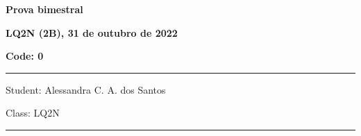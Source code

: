 \documentclass[12pt, addpoints]{exam}
\begin{document}
        \begin{minipage}[b]{0.75\linewidth}
            \begin{flushleft}
                {\bf \large Prova bimestral}
            \end{flushleft}
            \begin{flushleft}
                {\bf \large LQ2N (2B), 31 de outubro de 2022}
            \end{flushleft}
        \end{minipage}
        \begin{minipage}[b]{0.20\linewidth}
            \begin{flushright}
                {\bf \large Code: 0}
            \end{flushright}
        \end{minipage}
        \vspace{0.5cm} \hrule \vspace{0.5cm}
        \begin{minipage}{0.75\linewidth}
            \begin{flushleft}
                Student: Alessandra C. A. dos Santos
            \end{flushleft}
        \end{minipage}
        \begin{minipage}{0.20\linewidth}
            \begin{flushright}
                Class: LQ2N
            \end{flushright}
        \end{minipage}
        \vspace{0.5cm} \hrule \vspace{0.5cm}
\end{document}
